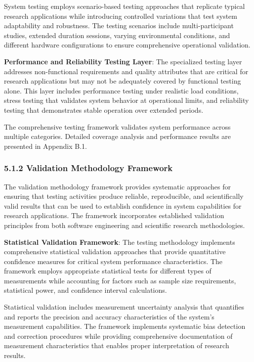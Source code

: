 \documentclass[12pt,a4paper]{article}
\begin{document}
System testing employs scenario-based testing approaches that replicate typical research applications while introducing
controlled variations that test system adaptability and robustness. The testing scenarios include multi-participant
studies, extended duration sessions, varying environmental conditions, and different hardware configurations to ensure
comprehensive operational validation.

\textbf{Performance and Reliability Testing Layer}: The specialized testing layer addresses non-functional requirements and
quality attributes that are critical for research applications but may not be adequately covered by functional testing
alone. This layer includes performance testing under realistic load conditions, stress testing that validates system
behavior at operational limits, and reliability testing that demonstrates stable operation over extended periods.

The comprehensive testing framework validates system performance across multiple categories. Detailed coverage analysis
and performance results are presented in Appendix B.1.

\subsubsection{5.1.2 Validation Methodology Framework}

The validation methodology framework provides systematic approaches for ensuring that testing activities produce
reliable, reproducible, and scientifically valid results that can be used to establish confidence in system capabilities
for research applications. The framework incorporates established validation principles from both software engineering
and scientific research methodologies.

\textbf{Statistical Validation Framework}: The testing methodology implements comprehensive statistical validation approaches
that provide quantitative confidence measures for critical system performance characteristics. The framework employs
appropriate statistical tests for different types of measurements while accounting for factors such as sample size
requirements, statistical power, and confidence interval calculations.

Statistical validation includes measurement uncertainty analysis that quantifies and reports the precision and accuracy
characteristics of the system's measurement capabilities. The framework implements systematic bias detection and
correction procedures while providing comprehensive documentation of measurement characteristics that enables proper
interpretation of research results.
\end{document}
